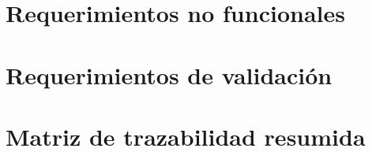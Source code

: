 \section{Requerimientos no funcionales}


\section{Requerimientos de validación}


\section{Matriz de trazabilidad resumida}


